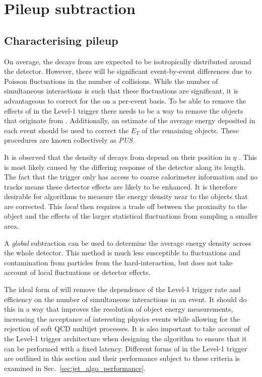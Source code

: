 \section{Pileup subtraction}
\label{sec:pus}

\subsection{Characterising pileup}
 
On average, the decays from \PU are expected to be isotropically
distributed around the detector. However, there will be significant
event-by-event differences due to Poisson fluctuations in the number
of \PU collisions. While the number of simultaneous interactions is
such that these fluctuations are significant, it is advantageous to
correct for the \PU on a per-event basis. To be able to remove the
effects of \PU in the Level-1 trigger there needs to be a way to remove
the objects that originate from \PU. Additionally, an
estimate of the average energy deposited in each event should be used
to correct the $E_T$ of the remaining objects. These procedures are
known collectively as \emph{\acf{PUS}}.

It is observed that the density of decays from \PU 
depend on their position in $\eta$ \cite{Cacciari2011}. This is
most likely caused by the differing response of the detector along its
length. The fact that the trigger only has access to
coarse calorimeter information and no tracks means these detector
effects are likely to be enhanced. It is therefore desirable for \PUS
algorithms to measure the \PU energy density near to the objects that
are corrected. This \emph{local} \PUS then requires a trade off
between the proximity to the object and the effects of the
larger statistical fluctuations from sampling a smaller area. 

A \emph{global} subtraction can be used to determine the average
energy density across the whole detector. This method is much less
susceptible to fluctuations and contamination from particles from the
hard-interaction, but does not take account of local fluctuations or
detector effects.

The ideal form of \PUS will remove the dependence of the Level-1
trigger rate and efficiency on the number of simultaneous interactions
in an event. It should do this in a way that improves the resolution
of object energy measurements, increasing the acceptance
of interesting physics events while allowing for the rejection of soft
QCD multijet processes. It is also important to take account of the
Level-1 trigger architecture when designing the algorithm to ensure
that it can be performed with a fixed latency. Different forms of \PUS
in the Level-1 trigger are outlined in this section and their
performance subject to these criteria is examined in
Sec.~\ref{sec:jet_algo_performance}. 

